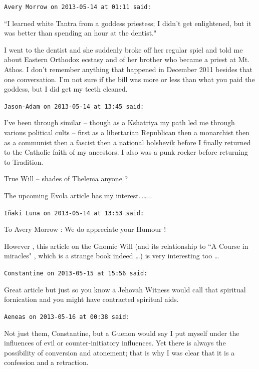 \begin{footnotesize}\begin{sffamily}



\texttt{Avery Morrow on 2013-05-14 at 01:11 said: }

``I learned white Tantra from a goddess priestess; I didn't get enlightened, but it was better than spending an hour at the dentist."

I went to the dentist and she suddenly broke off her regular spiel and told me about Eastern Orthodox ecstasy and of her brother who became a priest at Mt. Athos. I don't remember anything that happened in December 2011 besides that one conversation. I'm not sure if the bill was more or less than what you paid the goddess, but I did get my teeth cleaned.


\hfill

\texttt{Jason-Adam on 2013-05-14 at 13:45 said: }

I've been through similar – though as a Kshatriya my path led me through various political cults – first as a libertarian Republican then a monarchist then as a communist then a fascist then a national bolshevik before I finally returned to the Catholic faith of my ancestors. I also was a punk rocker before returning to Tradition.

True Will – shades of Thelema anyone ?

The upcoming Evola article has my interest……..


\hfill

\texttt{Iñaki Luna on 2013-05-14 at 13:53 said: }

To Avery Morrow : We do appreciate your Humour !

However , this article on the Gnomic Will (and its relationship to ``A Course in miracles" , which is a strange book indeed …) is very interesting too …


\hfill

\texttt{Constantine on 2013-05-15 at 15:56 said: }

Great article but just so you know a Jehovah Witness would call that spiritual fornication and you might have contracted spiritual aids.


\hfill

\texttt{Aeneas on 2013-05-16 at 00:38 said: }

Not just them, Constantine, but a Guenon would say I put myself under the influences of evil or counter-initiatory influences. Yet there is always the possibility of conversion and atonement; that is why I was clear that it is a confession and a retraction.



\end{sffamily}
\end{footnotesize}
